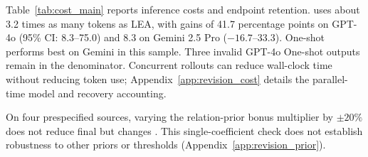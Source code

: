 Table~\ref{tab:cost_main} reports inference costs and endpoint retention. \samcgs{} uses about 3.2 times as many tokens as LEA, with \riskall{} gains of 41.7 percentage points on GPT-4o (95\% CI: 8.3--75.0) and 8.3 on Gemini 2.5 Pro (\mbox{$-16.7$--33.3}). One-shot performs best on Gemini in this sample. Three invalid GPT-4o One-shot outputs remain in the denominator. Concurrent rollouts can reduce wall-clock time without reducing token use; Appendix~\ref{app:revision_cost} details the parallel-time model and recovery accounting.

On four prespecified sources, varying the relation-prior bonus multiplier by $\pm20\%$ does not reduce final \riskall{} but changes \rootthree{}. This single-coefficient check does not establish robustness to other priors or thresholds (Appendix~\ref{app:revision_prior}).



